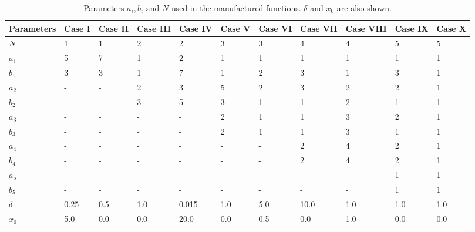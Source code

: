 \documentclass[11pt, oneside]{article}
\begin{document}
	\begin{table}[htbp]
		\caption{Parameters $a_i, b_i \text{ and } N$ used in the manufactured functions. $\delta$ and  $x_0$ are also shown.}
		\centering
		\begin{tabular}{@{}m{2cm}m{1cm}m{1cm}m{1cm}m{1cm}m{1cm}m{1cm}m{1cm}m{1cm}m{1cm}m{1cm}@{}}
            		\toprule
            		\textbf{Parameters} & \textbf{Case I} & \textbf{Case II} & \textbf{Case III} & \textbf{Case IV}  & \textbf{Case V}& \textbf{Case VI}& \textbf{Case VII}& \textbf{Case VIII}& \textbf{Case IX}& \textbf{Case X}\\
            		\midrule
            		$N$       & 1  & 1  & 2 & 2 & 3 & 3 & 4 & 4 & 5 & 5 \\
            		$a_1$     & 5  & 7  & 1 & 2 & 1 & 1 & 1 & 1 & 1 & 1 \\
            		$b_1$     & 3  & 3  & 1 & 7 & 1 & 2 & 3 & 1 & 3 & 1 \\
            		$a_2$     & -  & -  & 2 & 3 & 5 & 2 & 3 & 2 & 2 & 1 \\
            		$b_2$     & -  & -  & 3 & 5 & 3 & 1 & 1 & 2 & 1 & 1 \\
            		$a_3$     & -  & -  & - & - & 2 & 1 & 1 & 3 & 2 & 1 \\
                         	$b_3$     & -  & -  & - & - & 2 & 1 & 1 & 3 & 1 & 1 \\
                         	$a_4$     & -  & -  & - & - & - & - & 2 & 4 & 2 & 1 \\
                         	$b_4$     & -  & -  & - & - & - & - & 2 & 4 & 2 & 1 \\
                         	$a_5$     & -  & -  & - & - & - & - & - & - & 1 & 1 \\
                         	$b_5$     & -  & -  & - & - & - & - & - & - & 1 & 1 \\
            		$\delta$     & 0.25  & 0.5  & 1.0 & 0.015 & 1.0 & 5.0 & 10.0 & 1.0 & 1.0 & 1.0 \\
            		$x_0$     & 5.0  & 0.0  & 0.0 & 20.0 & 0.0 & 0.5 & 0.0 & 1.0 & 0.0 & 0.0 \\
            		\bottomrule
		\end{tabular}
		\label{tab:testcases}
	\end{table}
	
\end{document}

